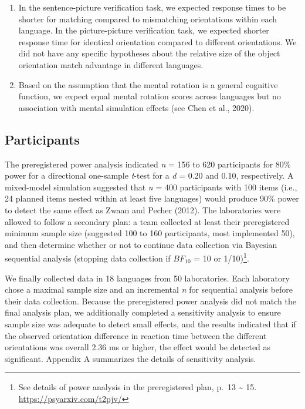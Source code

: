 \documentclass[
  man,floatsintext]{apa7}
\begin{document}
\begin{enumerate}
\def\labelenumi{(\arabic{enumi})}
\item
  In the sentence-picture verification task, we expected response times to be shorter for matching compared to mismatching orientations within each language. In the picture-picture verification task, we expected shorter response time for identical orientation compared to different orientations. We did not have any specific hypotheses about the relative size of the object orientation match advantage in different languages.
\item
  Based on the assumption that the mental rotation is a general cognitive function, we expect equal mental rotation scores across languages but no association with mental simulation effects (see Chen et al., 2020).
\end{enumerate}

\hypertarget{participants}{%
\subsection{Participants}\label{participants}}

The preregistered power analysis indicated \emph{n} = 156 to 620 participants for 80\% power for a directional one-sample \emph{t}-test for a \emph{d} = 0.20 and 0.10, respectively. A mixed-model simulation suggested that \emph{n} = 400 participants with 100 items (i.e., 24 planned items nested within at least five languages) would produce 90\% power to detect the same effect as Zwaan and Pecher (2012). The laboratories were allowed to follow a secondary plan: a team collected at least their preregistered minimum sample size (suggested 100 to 160 participants, most implemented 50), and then determine whether or not to continue data collection via Bayesian sequential analysis (stopping data collection if \(BF_{10}\) = 10 or 1/10)\footnote{See details of power analysis in the preregistered plan, p.~13 \textasciitilde{} 15. \url{https://psyarxiv.com/t2pjv/}}.

We finally collected data in 18 languages from 50 laboratories. Each laboratory chose a maximal sample size and an incremental \emph{n} for sequential analysis before their data collection. Because the preregistered power analysis did not match the final analysis plan, we additionally completed a sensitivity analysis to ensure sample size was adequate to detect small effects, and the results indicated that if the observed orientation difference in reaction time between the different orientations was overall 2.36 ms or higher, the effect would be detected as significant. Appendix A summarizes the details of sensitivity analysis.
\end{document}
